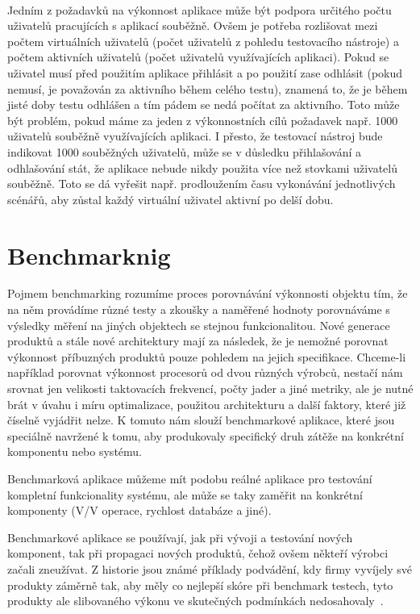 \documentclass[122pt,oneside]{fithesis}
\begin{document}
\vspace{5 mm}
\\\indent Jedním z požadavků na výkonnost aplikace může být podpora určitého počtu uživatelů pracujících s aplikací souběžně. Ovšem je potřeba rozlišovat mezi počtem virtuálních uživatelů (počet uživatelů z pohledu testovacího nástroje) a počtem aktivních uživatelů (počet uživatelů využívajících aplikaci). Pokud se uživatel musí před použitím aplikace přihlásit a po použití zase odhlásit (pokud nemusí, je považován za aktivního během celého testu), znamená to, že je během jisté doby testu odhlášen a tím pádem se nedá počítat za aktivního. Toto může být problém, pokud máme za jeden z výkonnostních cílů požadavek např. 1000 uživatelů souběžně využívajících aplikaci. I přesto, že testovací nástroj bude indikovat 1000 souběžných uživatelů, může se v důsledku přihlašování a odhlašování stát, že aplikace nebude nikdy použita více než stovkami uživatelů souběžně. Toto se dá vyřešit např. prodloužením času vykonávání jednotlivých scénářů, aby zůstal každý virtuální uživatel aktivní po delší dobu.

\chapter{Benchmarknig}

Pojmem benchmarking rozumíme proces porovnávání výkonnosti objektu tím, že na něm provádíme různé testy a zkoušky a naměřené hodnoty porovnáváme s výsledky měření na jiných objektech se stejnou funkcionalitou. Nové generace produktů a stále nové architektury mají za následek, že je nemožné porovnat výkonnost příbuzných produktů pouze pohledem na jejich specifikace. Chceme-li například porovnat výkonnost procesorů od dvou různých výrobců, nestačí nám srovnat jen velikosti taktovacích frekvencí, počty jader a jiné metriky, ale je nutné brát v úvahu i míru optimalizace, použitou architekturu a další faktory, které již číselně vyjádřit nelze. K tomuto nám slouží benchmarkové aplikace, které jsou speciálně navržené k tomu, aby produkovaly specifický druh zátěže na konkrétní komponentu nebo systému.

Benchmarková aplikace můžeme mít podobu reálné aplikace pro testování kompletní funkcionality systému, ale může se taky zaměřit na konkrétní komponenty (V/V operace, rychlost databáze a jiné).

Benchmarkové aplikace se používají, jak při vývoji a testování nových komponent, tak při propagaci nových produktů, čehož ovšem někteří výrobci začali zneužívat. Z historie jsou známé příklady podvádění, kdy firmy vyvíjely své produkty záměrně tak, aby měly co nejlepší skóre při benchmark testech, tyto produkty ale slibovaného výkonu ve skutečných podmínkách nedosahovaly~\cite{wikiBench}.
\end{document}
